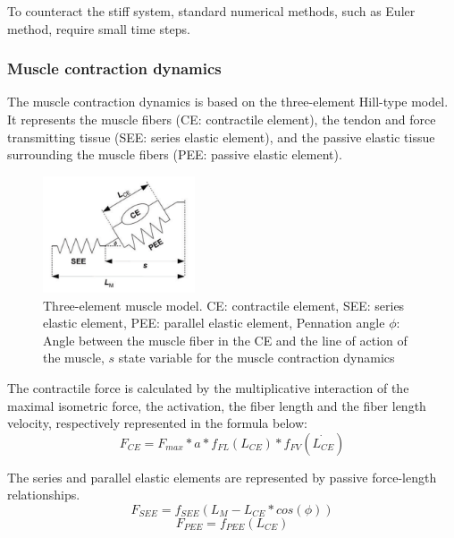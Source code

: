 To counteract the stiff system, standard numerical methods, such as Euler method, require small time steps.\newline


\subsubsection{Muscle contraction dynamics} \label{musclecontraction}

The muscle contraction dynamics is based on the three-element Hill-type model. It represents the muscle fibers (CE: contractile element), the tendon and force transmitting tissue (SEE: series elastic element), and the passive elastic tissue surrounding the muscle fibers (PEE: passive elastic element). 
\begin{figure}[ht!]
    \centering
\includegraphics[width=0.4\textwidth]{Pictures/DAS/Hill-Type_MuscleModel.png}
    \caption{Three-element muscle model. CE: contractile element, SEE: series elastic element, PEE: parallel elastic element, Pennation angle $\phi$: Angle between the muscle fiber in the CE and the line of action of the muscle, $s$ state variable for the muscle contraction dynamics \cite{IMP}}
    \label{fig:muscle_elements}
\end{figure}

The contractile force is calculated by the multiplicative interaction of the maximal isometric force, the activation, the fiber length and the fiber length velocity, respectively represented in the formula below:
\begin{equation}
    F_{CE} = F_{max}*a*f_{FL}(L_{CE})*f_{FV}(\dot{L_{CE}})
\end{equation}

The series and parallel elastic elements are represented by passive force-length relationships.
\begin{equation}
    F_{SEE} = f_{SEE}(L_{M}-L_{CE}*cos(\phi))
\end{equation}
\begin{equation}
    F_{PEE} = f_{PEE}(L_{CE})
\end{equation}

